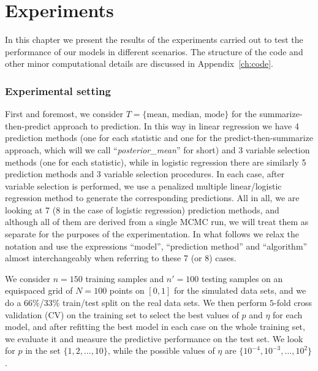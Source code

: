 %
%

\let\epsilon\varepsilon

\chapter{Experiments}\label{ch:experiments}

In this chapter we present the results of the experiments carried out to test the performance of our models in different scenarios. The structure of the code and other minor computational details are discussed in Appendix~\ref{ch:code}.

\subsection*{Experimental setting}

First and foremost, we consider \(T=\{\text{mean, median, mode}\}\) for the summarize-then-predict approach to prediction. In this way in linear regression we have 4 prediction methods (one for each statistic and one for the predict-then-summarize approach, which will we call ``\textit{posterior\_mean}'' for short) and 3 variable selection methods (one for each statistic), while in logistic regression there are similarly 5 prediction methods and 3 variable selection procedures. In each case, after variable selection is performed, we use a penalized multiple linear/logistic regression method to generate the corresponding predictions. All in all, we are looking at 7 (8 in the case of logistic regression) prediction methods, and although all of them are derived from a single MCMC run, we will treat them as separate for the purposes of the experimentation. In what follows we relax the notation and use the expressions ``model'', ``prediction method'' and ``algorithm'' almost interchangeably when referring to these 7 (or 8) cases.

We consider \(n=150\) training samples and \(n'=100\) testing samples on an equispaced grid of \(N=100\) points on \([0, 1]\) for the simulated data sets, and we do a 66\%/33\% train/test split on the real data sets. We then perform \(5\)-fold cross validation (CV) on the training set to select the best values of \(p\) and \(\eta\) for each model, and after refitting the best model in each case on the whole training set, we evaluate it and measure the predictive performance on the test set. We look for \(p\) in the set \(\{1,2,\dots,10\}\), while the possible values of \(\eta\) are \(\{10^{-4}, 10^{-3}, \dots, 10^2\}\).


